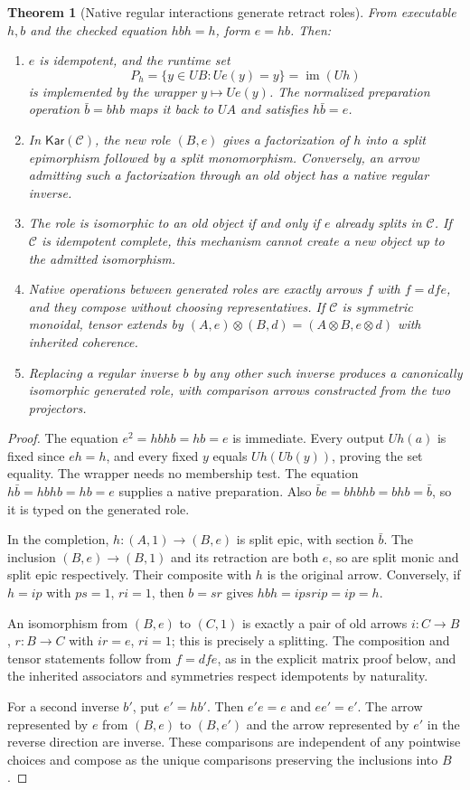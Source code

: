 \documentclass[11pt]{article}
\newtheorem{theorem}{Theorem}[section]
\theoremstyle{definition}
\theoremstyle{remark}
\newcommand{\Kar}{\mathsf{Kar}}
\newcommand{\im}{\operatorname{im}}
\begin{document}
\begin{theorem}[Native regular interactions generate retract roles]\label{m-thm:abstract}
From executable $h,b$ and the checked equation $hbh=h$, form $e=hb$. Then:
\begin{enumerate}
\item $e$ is idempotent, and the runtime set
\[
       P_h=\{y\in UB:Ue(y)=y\}=\im(Uh)
\]
is implemented by the wrapper $y\mapsto Ue(y)$. The normalized preparation operation $\bar b=bhb$ maps it back to $UA$ and satisfies $h\bar b=e$.
\item In $\Kar(\mathcal C)$, the new role $(B,e)$ gives a factorization of $h$ into a split epimorphism followed by a split monomorphism. Conversely, an arrow admitting such a factorization through an old object has a native regular inverse.
\item The role is isomorphic to an old object if and only if $e$ already splits in $\mathcal C$. If $\mathcal C$ is idempotent complete, this mechanism cannot create a new object up to the admitted isomorphism.
\item Native operations between generated roles are exactly arrows $f$ with $f=dfe$, and they compose without choosing representatives. If $\mathcal C$ is symmetric monoidal, tensor extends by $(A,e)\otimes(B,d)=(A\otimes B,e\otimes d)$ with inherited coherence.
\item Replacing a regular inverse $b$ by any other such inverse produces a canonically isomorphic generated role, with comparison arrows constructed from the two projectors.
\end{enumerate}
\end{theorem}
\begin{proof}
The equation $e^2=hbhb=hb=e$ is immediate. Every output $Uh(a)$ is fixed since $eh=h$, and every fixed $y$ equals $Uh(Ub(y))$, proving the set equality. The wrapper needs no membership test. The equation $h\bar b=hbhb=hb=e$ supplies a native preparation. Also $\bar b e=bhbhb=bhb=\bar b$, so it is typed on the generated role.

In the completion, $h:(A,1)\to(B,e)$ is split epic, with section $\bar b$. The inclusion $(B,e)\to(B,1)$ and its retraction are both $e$, so are split monic and split epic respectively. Their composite with $h$ is the original arrow. Conversely, if $h=ip$ with $ps=1$, $ri=1$, then $b=sr$ gives $hbh=ipsrip=ip=h$.

An isomorphism from $(B,e)$ to $(C,1)$ is exactly a pair of old arrows $i:C\to B$, $r:B\to C$ with $ir=e$, $ri=1$; this is precisely a splitting. The composition and tensor statements follow from $f=dfe$, as in the explicit matrix proof below, and the inherited associators and symmetries respect idempotents by naturality.

For a second inverse $b'$, put $e'=hb'$. Then $e'e=e$ and $ee'=e'$. The arrow represented by $e$ from $(B,e)$ to $(B,e')$ and the arrow represented by $e'$ in the reverse direction are inverse. These comparisons are independent of any pointwise choices and compose as the unique comparisons preserving the inclusions into $B$.
\end{proof}
\end{document}

